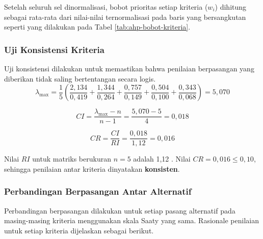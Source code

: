 Setelah seluruh sel dinormalisasi, bobot prioritas setiap kriteria ($w_i$)
dihitung sebagai rata-rata dari nilai-nilai ternormalisasi pada baris yang
bersangkutan seperti yang dilakukan pada Tabel \ref{tab:ahp-bobot-kriteria}.


\subsubsection{Uji Konsistensi Kriteria}
Uji konsistensi dilakukan untuk memastikan bahwa penilaian berpasangan yang diberikan tidak saling bertentangan secara logis.
$$\lambda_{\max} = \frac{1}{5}\left(\frac{2{,}134}{0{,}419} + \frac{1{,}344}{0{,}264} + \frac{0{,}757}{0{,}149} + \frac{0{,}504}{0{,}100} + \frac{0{,}343}{0{,}068}\right) = 5{,}070$$

$$CI = \frac{\lambda_{\max} - n}{n - 1} = \frac{5{,}070 - 5}{4} = 0{,}018$$

$$CR = \frac{CI}{RI} = \frac{0{,}018}{1{,}12} = 0{,}016$$

Nilai $RI$ untuk matriks berukuran $n = 5$ adalah 1,12 \cite{Saaty1980}. Nilai $CR = 0{,}016 \leq 0{,}10$, sehingga penilaian antar kriteria dinyatakan \textbf{konsisten}.

\subsubsection{Perbandingan Berpasangan Antar Alternatif}

Perbandingan berpasangan dilakukan untuk setiap pasang alternatif pada masing-masing kriteria menggunakan skala Saaty yang sama. Rasionale penilaian untuk setiap kriteria dijelaskan sebagai berikut.

